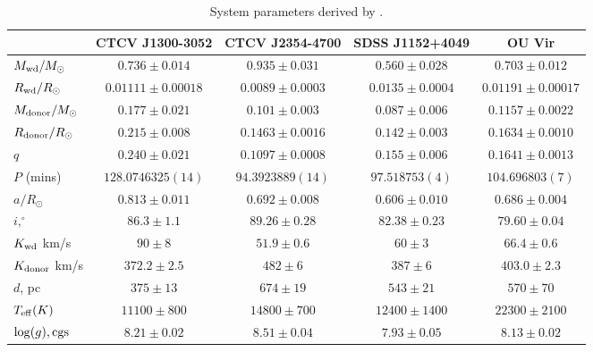 \begin{landscape}
        \begin{table}
            \centering
            \caption{System parameters derived by \citet{Savoury2011}.}
            \label{appendix:table:savoury system params}
            \begin{tabular}{lcccc}
                \hline
                ~                           & {\bf CTCV J1300-3052} & {\bf CTCV J2354-4700} & {\bf SDSS J1152+4049} & {\bf OU Vir}      \\
                \hline
                \hline
                $M_{\rm wd}/M_{\odot}$      & $0.736\pm0.014$       & $0.935\pm0.031$       & $0.560\pm0.028$   & $0.703\pm0.012$       \\
                $R_{\rm wd}/R_{\odot}$      & $0.01111\pm0.00018$   & $0.0089\pm0.0003$     & $0.0135\pm0.0004$ & $0.01191\pm0.00017$   \\
                $M_{\rm donor}/M_{\odot}$   & $0.177\pm0.021$       & $0.101\pm0.003$       & $0.087\pm0.006$   & $0.1157\pm0.0022$     \\
                $R_{\rm donor}/R_{\odot}$   & $0.215\pm0.008$       & $0.1463\pm0.0016$     & $0.142\pm0.003$   & $0.1634\pm0.0010$     \\
                $q$                         & $0.240\pm0.021$       & $0.1097\pm0.0008$     & $0.155\pm0.006$   & $0.1641\pm0.0013$     \\
                \hline
                $P$ (mins)                  & $128.0746325(14)$     & $94.3923889(14)$      & $97.518753(4)$    & $104.696803(7)$       \\
                $a/R_{\odot}$               & $0.813\pm0.011$       & $0.692\pm0.008$       & $0.606\pm0.010$   & $0.686\pm0.004$       \\
                $i, ^\circ$                 & $86.3\pm1.1$          & $89.26\pm0.28$        & $82.38\pm0.23$    & $79.60\pm0.04$        \\
                $K_{\rm wd}$ km/s           & $90\pm8$              & $51.9\pm0.6$          & $60\pm3$          &  $66.4\pm0.6$         \\
                $K_{\rm donor}$ km/s        & $372.2\pm2.5$         & $482\pm6$             & $387\pm6$         & $403.0\pm2.3$         \\
                \hline
                $d$, pc                     & $375\pm13$            & $674\pm19$            & $543\pm21$        & $570\pm70$            \\
                $T_{\rm eff} (K)$           & $11100\pm800$         & $14800\pm700$         & $12400\pm1400$    & $22300\pm2100$        \\
                $\log(g), {\rm cgs}$        & $8.21\pm0.02$         & $8.51\pm0.04$         & $7.93\pm0.05$     & $8.13\pm0.02$         \\
                \hline
                \hline
            \end{tabular}
        \end{table}


\end{landscape}
